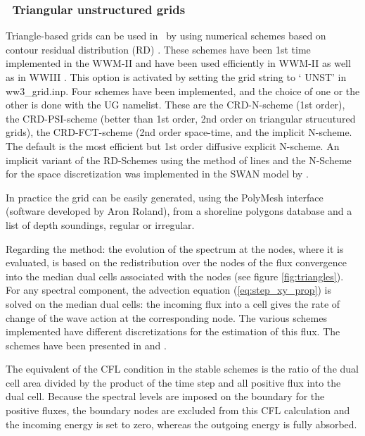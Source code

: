 \vssub
\subsubsection{~Triangular unstructured grids} \label{sub:num_space_tri}

\noindent 
Triangle-based grids can be used in \ws\ by using numerical schemes based on
contour residual distribution (RD) \citep[see][for a review]{rep:Roland2008}.
These schemes have been 1st time implemented in the WWM-II and have been used
efficiently in WWM-II as well as in WWIII \citep[e.g.][]{art:Aea09,
art:Mea10}.  This option is activated by setting the grid string to `{\code
UNST}' in {\file ww3\_grid.inp}.  Four schemes have been implemented, and the
choice of one or the other is done with the {\code UG} namelist.  These are
the CRD-N-scheme (1st order), the CRD-PSI-scheme (better than 1st order, 2nd
order on triangular strucutured grids), the CRD-FCT-scheme (2nd order
space-time, and the implicit N-scheme. The default is the most efficient but
1st order diffusive explicit N-scheme. An implicit variant of the RD-Schemes
using the method of lines and the N-Scheme for the space discretization was
implemented in the SWAN model by \cite{art:Zij10}.

In practice the grid can be easily generated, using the PolyMesh interface
(software developed by Aron Roland), from a shoreline polygons database
\citep[e.g.][]{art:WS96} and a list of depth soundings, regular or irregular.

Regarding the method: the evolution of the spectrum at the nodes, where it is
evaluated, is based on the redistribution over the nodes of the flux
convergence into the median dual cells associated with the nodes (see figure
\ref{fig:triangles}).  For any spectral component, the advection equation
(\ref{eq:step_xy_prop}) is solved on the median dual cells: the incoming flux
into a cell gives the rate of change of the wave action at the corresponding
node. The various schemes implemented have different discretizations for the
estimation of this flux. The schemes have been presented in \citep[see][for a
review]{rep:Roland2008} and \citet{pro:Rol12}.

The equivalent of the CFL condition in the stable schemes is the ratio of the
dual cell area divided by the product of the time step and all positive flux
into the dual cell. Because the spectral levels are imposed on the boundary
for the positive fluxes, the boundary nodes are excluded from this CFL
calculation and the incoming energy is set to zero, whereas the outgoing energy 
is fully absorbed. 

